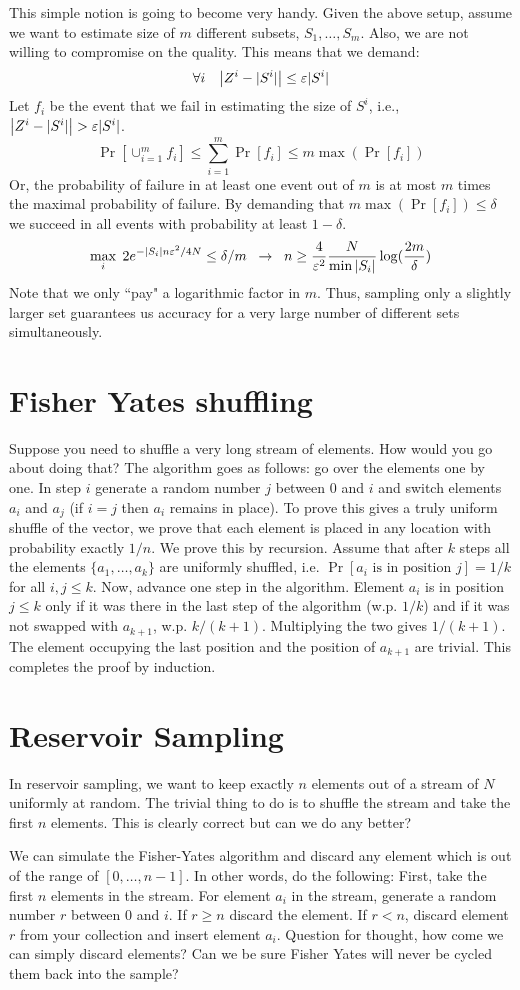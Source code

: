 \documentclass{article}
\begin{document}
This simple notion is going to become very handy. Given the above setup, assume we want to
estimate size of $m$ different subsets, $S_1,\ldots,S_m$.
Also, we are not willing to compromise on the quality. This means that we demand:
\[
\forall i \;\;\;\left| Z^i - |S^i| \right| \le \varepsilon|S^i| 
\]
Let $f_i$ be the event that we fail in estimating the size of $S^i$, i.e., $\left| Z^i - |S^i| \right| > \varepsilon|S^i|$.
\[
\Pr[\cup_{i=1}^{m}f_i] \le \sum_{i=1}^{m}\Pr[f_i] \le m \max(\Pr[f_i]) 
\]
Or, the probability of failure in at least one event out of $m$ is at most $m$ times the maximal probability of failure.
By demanding that $ m \max(\Pr[f_i]) \le \delta$ we succeed in all events with probability at least $1-\delta$.
\[
\max_i \; 2e^{-|S_i|n\varepsilon^2/4N} \le \delta/m \;\; \rightarrow \;\; n \ge \frac{4}{\varepsilon^2}\frac{N}{\min{|S_i|}}\log(\frac{2m}{\delta})
\]
Note that we only ``pay" a logarithmic factor in $m$.
Thus, sampling only a slightly larger set guarantees us accuracy for a very large number of
different sets simultaneously.

\section{Fisher Yates shuffling}
Suppose you need to shuffle a very long stream of elements. How would you go about doing that?
The algorithm goes as follows: go over the elements one by one.
In step $i$ generate a random number $j$ between $0$ and $i$ and switch
elements $a_i$ and $a_j$ (if $i=j$ then $a_i$ remains in place).
To prove this gives a truly uniform shuffle of the vector, we prove that each element 
is placed in any location with probability exactly $1/n$.
We prove this by recursion. Assume that after $k$ steps all the elements $\{a_1,\ldots,a_k\}$ 
are uniformly shuffled, i.e. $\Pr[a_i \mbox{ is in position } j] = 1/k$ for all $i,j \le k$. 
Now, advance one step in the algorithm.
Element $a_i$ is in position $j \le k$ only if it was there in the last step of the algorithm (w.p. $1/k$) and if
it was not swapped with $a_{k+1}$, w.p. $k/(k+1)$. Multiplying the two gives $1/(k+1)$.
The element occupying the last position and the position of $a_{k+1}$ are trivial. 
This completes the proof by induction.

\section{Reservoir Sampling}
In reservoir sampling, we want to keep exactly $n$ elements out of a stream of $N$ uniformly at random.
The trivial thing to do is to shuffle the stream and take the first $n$ elements. 
This is clearly correct but can we do any better?

We can simulate the Fisher-Yates algorithm and discard any element which is out
of the range of $[0,\ldots,n-1]$. In other words, do the following:
First, take the first $n$ elements in the stream.
For element $a_i$ in the stream, generate a random number $r$ between $0$ and $i$.
If $r \ge n$ discard the element. If $r<n$, discard element $r$ from your collection and insert element $a_i$.
Question for thought, how come we can simply discard elements? Can we be sure Fisher Yates will never be cycled them back into the sample?
\end{document}
